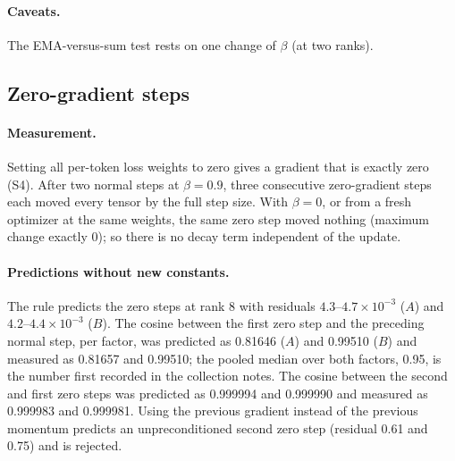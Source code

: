 \documentclass[11pt]{article}
\begin{document}
\paragraph{Caveats.} The EMA-versus-sum test rests on one change of $\beta$ (at two ranks).

\subsection{Zero-gradient steps}\label{sec:ev-zero}
\paragraph{Measurement.} Setting all per-token loss weights to zero gives a gradient that is exactly
zero (S4). After two normal steps at $\beta=0.9$, three consecutive zero-gradient steps each moved
every tensor by the full step size. With $\beta=0$, or from a fresh optimizer at the same weights,
the same zero step moved nothing (maximum change exactly 0); so there is no decay term independent
of the update.

\paragraph{Predictions without new constants.} The rule predicts the zero steps at rank 8 with
residuals $4.3$--$4.7\times10^{-3}$ ($A$) and $4.2$--$4.4\times10^{-3}$ ($B$). The cosine between the
first zero step and the preceding normal step, per factor, was predicted as 0.81646 ($A$) and 0.99510
($B$) and measured as 0.81657 and 0.99510; the pooled median over both factors, 0.95, is the number
first recorded in the collection notes. The cosine between the second and first zero steps was
predicted as 0.999994 and 0.999990 and measured as 0.999983 and 0.999981. Using the previous gradient
instead of the previous momentum predicts an unpreconditioned second zero step (residual 0.61 and
0.75) and is rejected.
\end{document}
